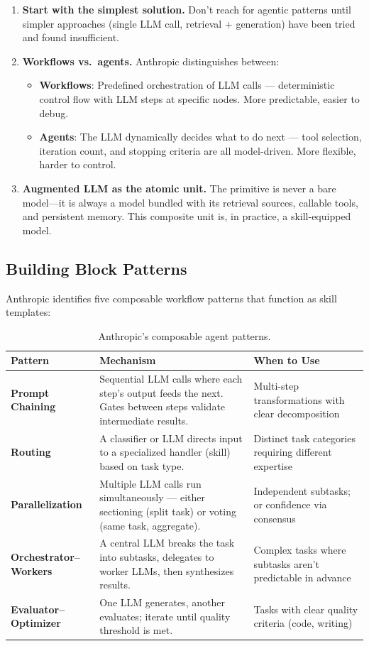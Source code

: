 \begin{enumerate}
  \item \textbf{Start with the simplest solution.} Don’t reach for agentic patterns until simpler approaches (single LLM call, retrieval + generation) have been tried and found insufficient.
  \item \textbf{Workflows vs.~agents.} Anthropic distinguishes between:

\begin{itemize}
  \item \textbf{Workflows}: Predefined orchestration of LLM calls --- deterministic control flow with LLM steps at specific nodes. More predictable, easier to debug.
  \item \textbf{Agents}: The LLM dynamically decides what to do next --- tool selection, iteration count, and stopping criteria are all model-driven. More flexible, harder to control.
\end{itemize}
  \item \textbf{Augmented LLM as the atomic unit.} The primitive is never a bare model---it is always a model bundled with its retrieval sources, callable tools, and persistent memory. This composite unit is, in practice, a skill-equipped model.
\end{enumerate}

\subsection{Building Block Patterns}
\label{building-block-patterns}

Anthropic identifies five composable workflow patterns that function as skill templates:

\begin{table}[ht!]
\centering
\caption{Anthropic’s composable agent patterns.}
\begin{tabular}{@{}lp{5cm}p{8cm}@{}}
\toprule
\textbf{Pattern} & \textbf{Mechanism} & \textbf{When to Use} \\
\midrule
\textbf{Prompt Chaining} & Sequential LLM calls where each step’s output feeds the next. Gates between steps validate intermediate results. & Multi-step transformations with clear decomposition \\
\textbf{Routing} & A classifier or LLM directs input to a specialized handler (skill) based on task type. & Distinct task categories requiring different expertise \\
\textbf{Parallelization} & Multiple LLM calls run simultaneously --- either sectioning (split task) or voting (same task, aggregate). & Independent subtasks; or confidence via consensus \\
\textbf{Orchestrator--Workers} & A central LLM breaks the task into subtasks, delegates to worker LLMs, then synthesizes results. & Complex tasks where subtasks aren’t predictable in advance \\
\textbf{Evaluator--Optimizer} & One LLM generates, another evaluates; iterate until quality threshold is met. & Tasks with clear quality criteria (code, writing) \\
\bottomrule
\end{tabular}
\end{table}

